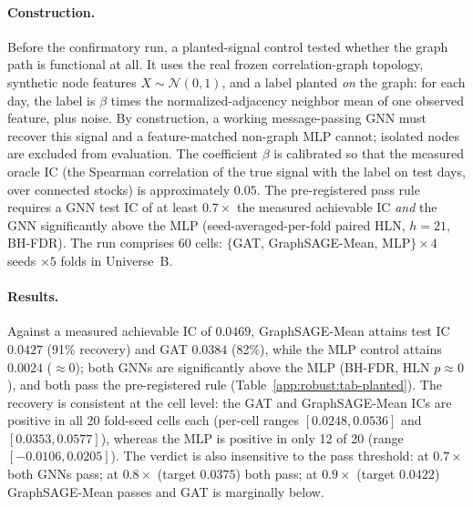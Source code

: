 \documentclass{article}
\begin{document}
\paragraph{Construction.} Before the confirmatory run, a planted-signal control
tested whether the graph path is functional at all. It uses the real frozen
correlation-graph topology, synthetic node features $X\sim\mathcal{N}(0,1)$, and
a label planted \emph{on} the graph: for each day, the label is $\beta$ times
the normalized-adjacency neighbor mean of one observed feature, plus noise. By
construction, a working message-passing GNN must recover this signal and a
feature-matched non-graph MLP cannot; isolated nodes are excluded from
evaluation. The coefficient $\beta$ is calibrated so that the measured oracle IC
(the Spearman correlation of the true signal with the label on test days, over
connected stocks) is approximately $0.05$. The pre-registered pass rule requires
a GNN test IC of at least $0.7\times$ the measured achievable IC \emph{and} the
GNN significantly above the MLP (seed-averaged-per-fold paired HLN, $h=21$,
BH-FDR). The run comprises 60 cells: $\{$GAT, GraphSAGE-Mean, MLP$\}\times4$
seeds $\times5$ folds in Universe~B.

\paragraph{Results.}
Against a measured achievable IC of $0.0469$, GraphSAGE-Mean attains test IC
$0.0427$ (91\% recovery) and GAT $0.0384$ (82\%), while the MLP control attains
$0.0024$ (${\approx}0$); both GNNs are significantly above the MLP (BH-FDR, HLN
$p\approx0$), and both pass the pre-registered rule
(Table~\ref{app:robust:tab-planted}). The recovery is consistent at the cell
level: the GAT and GraphSAGE-Mean ICs are positive in all 20 fold-seed cells
each (per-cell ranges $[0.0248,0.0536]$ and $[0.0353,0.0577]$), whereas the MLP
is positive in only 12 of 20 (range $[-0.0106,0.0205]$).
The verdict is also insensitive to the pass threshold: at $0.7\times$ both GNNs
pass; at $0.8\times$ (target $0.0375$) both pass; at $0.9\times$ (target
$0.0422$) GraphSAGE-Mean passes and GAT is marginally below.
\end{document}
